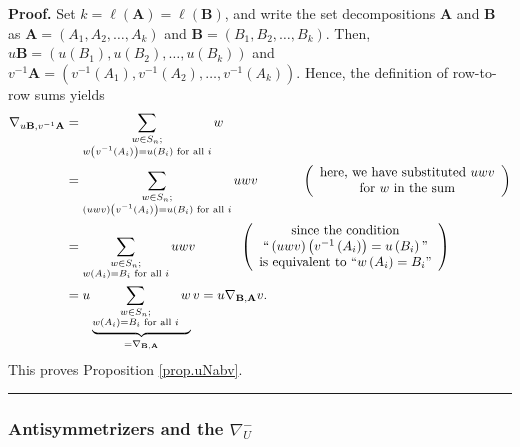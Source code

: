 \documentclass[numbers=enddot,12pt,final,onecolumn,notitlepage]{scrartcl}%
\numberwithin{exer}{subsection}
\theoremstyle{definition}
\newenvironment{proof}[1][Proof]{\noindent\textbf{#1.} }{\ \rule{0.5em}{0.5em}}
\let\sumnonlimits\sum
\renewcommand{\sum}{\sumnonlimits\limits}
\begin{document}
\begin{proof}
Set $k=\ell\left(  \mathbf{A}\right)  =\ell\left(  \mathbf{B}\right)  $, and
write the set decompositions $\mathbf{A}$ and $\mathbf{B}$ as $\mathbf{A}%
=\left(  A_{1},A_{2},\ldots,A_{k}\right)  $ and $\mathbf{B}=\left(
B_{1},B_{2},\ldots,B_{k}\right)  $. Then, $u\mathbf{B}=\left(  u\left(
B_{1}\right)  ,u\left(  B_{2}\right)  ,\ldots,u\left(  B_{k}\right)  \right)
$ and $v^{-1}\mathbf{A}=\left(  v^{-1}\left(  A_{1}\right)  ,v^{-1}\left(
A_{2}\right)  ,\ldots,v^{-1}\left(  A_{k}\right)  \right)  $. Hence, the
definition of row-to-row sums yields%
\begin{align*}
\nabla_{u\mathbf{B},v^{-1}\mathbf{A}}  &  =\sum_{\substack{w\in S_{n}%
;\\w\left(  v^{-1}\left(  A_{i}\right)  \right)  =u\left(  B_{i}\right)
\text{ for all }i}}w\\
&  =\sum_{\substack{w\in S_{n};\\\left(  uwv\right)  \left(  v^{-1}\left(
A_{i}\right)  \right)  =u\left(  B_{i}\right)  \text{ for all }i}%
}uwv\ \ \ \ \ \ \ \ \ \ \left(
\begin{array}
[c]{c}%
\text{here, we have substituted }uwv\\
\text{for }w\text{ in the sum}%
\end{array}
\right) \\
&  =\sum_{\substack{w\in S_{n};\\w\left(  A_{i}\right)  =B_{i}\text{ for all
}i}}uwv\ \ \ \ \ \ \ \ \ \ \left(
\begin{array}
[c]{c}%
\text{since the condition}\\
\text{\textquotedblleft}\left(  uwv\right)  \left(  v^{-1}\left(
A_{i}\right)  \right)  =u\left(  B_{i}\right)  \text{\textquotedblright}\\
\text{is equivalent to \textquotedblleft}w\left(  A_{i}\right)  =B_{i}%
\text{\textquotedblright}%
\end{array}
\right) \\
&  =u\underbrace{\sum_{\substack{w\in S_{n};\\w\left(  A_{i}\right)
=B_{i}\text{ for all }i}}w}_{=\nabla_{\mathbf{B},\mathbf{A}}}v=u\nabla
_{\mathbf{B},\mathbf{A}}v.
\end{align*}
This proves Proposition \ref{prop.uNabv}.
\end{proof}

\subsubsection{Antisymmetrizers and the $\nabla_{U}^{-}$}
\end{document}

